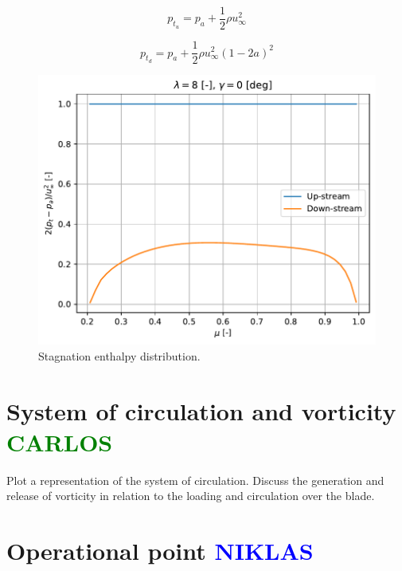 \begin{equation}
	p_{t_u} = p_a + \frac{1}{2} \rho u_{\infty}^2
	\label{eq:pt-up}
\end{equation}

\begin{equation}
	p_{t_d} = p_a + \frac{1}{2} \rho u_{\infty}^2 (1-2a)^2
	\label{eq:pt-down}
\end{equation}

\begin{figure}[htbp]
	\centering
	\includegraphics[height=0.45\textheight]{./img/stagnation-enthalpy.pdf}
	\caption{Stagnation enthalpy distribution.}
	\label{img:pt}
\end{figure}

\section{System of circulation and vorticity \textcolor{green}{CARLOS}}

Plot a representation of the system of circulation. Discuss the generation and release of vorticity in relation to the loading and circulation over the blade.

\section{Operational point \textcolor{blue}{NIKLAS}}
